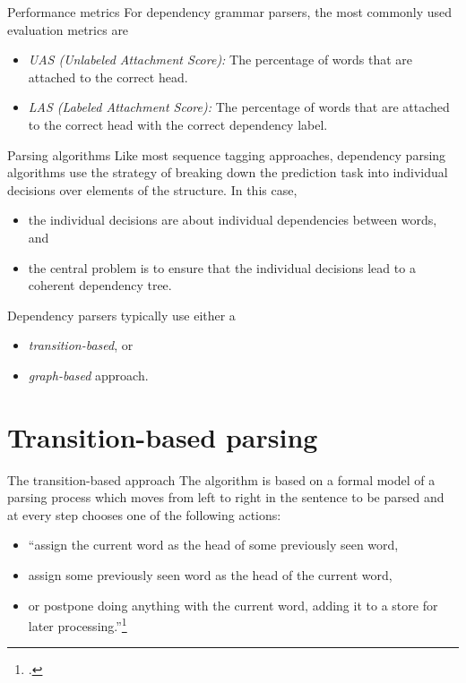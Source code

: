 \documentclass[style=upen, size=14pt]{powerdot}
\newcommand{\gold}{\color{arany}}
\theoremstyle{definition}
\begin{document}
\begin{slide}{Performance metrics}
  For dependency grammar parsers, the most commonly used evaluation metrics are
  \begin{itemize}
  \item \emph{\gold UAS (Unlabeled Attachment Score):} The percentage of words that are
    attached to the correct head.
  \item \emph{\gold LAS (Labeled Attachment Score):} The percentage of words that are
    attached to the correct head with the correct dependency label.
  \end{itemize}
\end{slide}

\begin{slide}{Parsing algorithms}
  Like most sequence tagging approaches, dependency parsing algorithms use the
  strategy of breaking down the prediction task into individual decisions over
  elements of the structure. In this case,

  \begin{itemize}
  \item the individual decisions are about individual dependencies between words, and
  \item the central problem is to ensure that the individual decisions lead to a
    coherent dependency tree.
  \end{itemize}
  Dependency parsers typically use either a 
  \begin{itemize}
  \item \emph{\gold transition-based}, or
  \item \emph{\gold graph-based} approach.
  \end{itemize}
\end{slide}

\section{Transition-based parsing}

\begin{slide}[toc=The model]{The transition-based approach}
  The algorithm is based on a formal model of a parsing process which moves from
  left to right in the sentence to be parsed and at every step chooses one of
  the following actions:
  \begin{itemize}
  \item ``assign the current word as the head of some previously seen word,
  \item assign some previously seen word as the head of the current word,
  \item or postpone doing anything with the current word, adding it to a store
    for later processing.''\footnote{\citet[ch. 15]{jurafsky2019speech}.}
  \end{itemize}
\end{slide}
\end{document}
